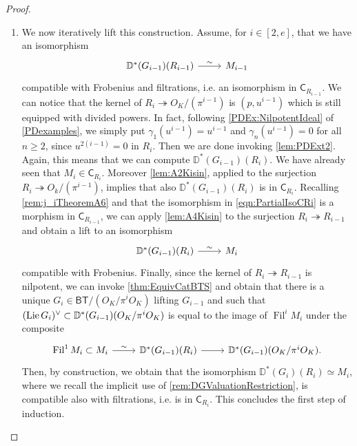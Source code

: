 \begin{proof}
\begin{enumerate}
\item We now iteratively lift this construction.
	Assume, for $i \in [2,e]$, that we have an isomorphism
	\begin{equation}\label{eqn:PartialIsoCRi}
	\begin{tikzcd}
	\mathbb{D}^*(G_{i-1})(R_{i-1}) 
	\arrow[r, "\sim", rightarrow] &
	M_{i-1}
	\end{tikzcd}
	\end{equation}
	compatible with Frobenius and filtrations, i.e. an isomorphism in $\mathsf{C}_{R_{i-1}}$.
	We can notice that the kernel of $R_i \twoheadrightarrow O_K/ (\pi^{i-1})$
	is $(p, u^{i-1})$ which is still equipped with divided powers.
	In fact, following \cref{PDEx:NilpotentIdeal} of \cref{PDexamples},
	we simply put $\gamma_1(u^{i-1}) = u^{i-1}$ and
	$\gamma_n(u^{i-1}) = 0$ for all $n \geq 2$,
	since $u^{2(i-1)} = 0$ in $R_i$.
	Then we are done invoking \cref{lem:PDExt2}.
	Again, this means that we can compute $\mathbb{D}^*(G_{i-1})(R_i)$.
	We have already seen that $M_i \in \mathsf{C}_{R_i}$.
	Moreover \cref{lem:A2Kisin},
	applied to the surjection $R_i \twoheadrightarrow O_k/ (\pi^{i-1})$, implies that
	also $\mathbb{D}^*(G_{i-1})(R_i)$ is in $\mathsf{C}_{R_i}$.
	Recalling \cref{rem:j_iTheoremA6} and that the isomorphism in \cref{eqn:PartialIsoCRi}
	is a morphism in $\mathsf{C}_{R_{i-1}}$, 
	we can apply \cref{lem:A4Kisin} to the surjection $R_i \twoheadrightarrow R_{i-1}$
	and obtain a lift to an isomorphism
	\begin{equation*}
	\begin{tikzcd}
	\mathbb{D}^*(G_{i-1})(R_{i}) 
	\arrow[r, "\sim", rightarrow] &
	M_{i}
	\end{tikzcd}
	\end{equation*}
	compatible with Frobenius.
	Finally, since the kernel of $R_i \twoheadrightarrow R_{i-1}$ is nilpotent,
	we can invoke \cref{thm:EquivCatBTS} and obtain that
	there is a unique $G_i \in \mathsf{BT}/ (O_K/\pi^iO_K)$
	lifting $G_{i-1}$ and such that $(\operatorname{Lie} G_i)^\vee \subset \mathbb{D}^*(G_{i-1})(O_K/\pi^i O_K)$
	is equal to the image of $\operatorname{Fil}^i M_i$ under the composite
	\begin{equation*}
	\begin{tikzcd}
		\operatorname{Fil}^1 M_i \subset M_i
		\arrow[r, "\sim", rightarrow] &
		\mathbb{D}^*(G_{i-1})(R_i)
		\arrow[r, "", rightarrow] &
		\mathbb{D}^*(G_{i-1})(O_K/\pi^iO_K)
	.\end{tikzcd}
	\end{equation*}
	Then, by construction, we obtain that the isomorphism
	$\mathbb{D}^*(G_i)(R_i) \simeq M_i$, where we recall the implicit use of 
	\cref{rem:DGValuationRestriction}, is compatible also with filtrations,
	i.e. is in $\mathsf{C}_{R_i}$.
	This concludes the first step of induction.


\end{enumerate}
\end{proof}
